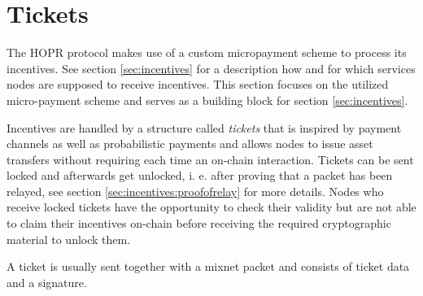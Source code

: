 \section{Tickets}
\label{sec:tickets}

The HOPR protocol makes use of a custom micropayment scheme to process its incentives. See section \ref{sec:incentives} for a description how and for which services nodes are supposed to receive incentives. This section focuses on the utilized micro-payment scheme and serves as a building block for section \ref{sec:incentives}.

Incentives are handled by a structure called \textit{tickets} that is inspired by payment channels as well as probabilistic payments and allows nodes to issue asset transfers without requiring each time an on-chain interaction. Tickets can be sent locked and afterwards get unlocked, i. e. after proving that a packet has been relayed, see section \ref{sec:incentives:proofofrelay} for more details. Nodes who receive locked tickets have the opportunity to check their validity but are not able to claim their incentives on-chain before receiving the required cryptographic material to unlock them.

A ticket is usually sent together with a mixnet packet and consists of ticket data and a signature.


